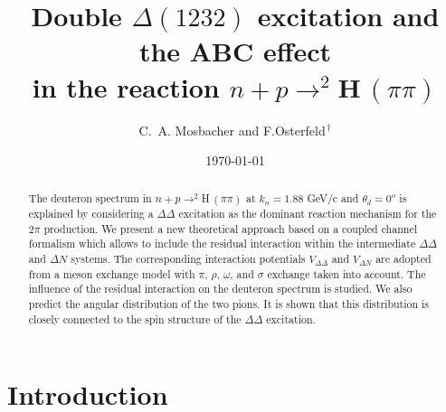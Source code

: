 


\draft

\def\DD{{\Delta \Delta}}
\def\DN{{\Delta N}}
\def\ND{{N \Delta}}

\title{Double $\Delta(1232)$ excitation and the ABC effect \\ 
  in the reaction $n+p \to ^2$H$\, (\pi\pi)$}

\author{C.~A. Mosbacher and F.Osterfeld$^{\,\dagger}$}

\address{Institut f\"ur Kernphysik, Forschungszentrum J\"ulich GmbH, 
  D--52425 J\"ulich, Germany}

\date{\today}

\maketitle

                                                                              

\begin{abstract}


The deuteron spectrum in $n+p \to ^2$H$\, (\pi\pi)$
at $k_n = 1.88$ GeV/c and $\theta_d = 0^o$
is explained by considering a $\Delta \Delta$ excitation as the dominant reaction  
mechanism for the $2\pi$ production. 
We present a new theoretical approach based on a coupled channel 
formalism which allows to include the residual interaction
within the intermediate $\DD$ and $\DN$ systems. The corresponding
interaction potentials $V_\DD$ and $V_\DN$ are adopted from a meson
exchange model with $\pi$, $\rho$, $\omega$, and $\sigma$ exchange
taken into account.
The influence of the residual interaction on the deuteron spectrum is studied.
We also predict the angular distribution of the two pions. It is shown that this
distribution is closely connected to the spin structure of the $\DD$
excitation.

\end{abstract}
                                                                                 





\section{Introduction}

